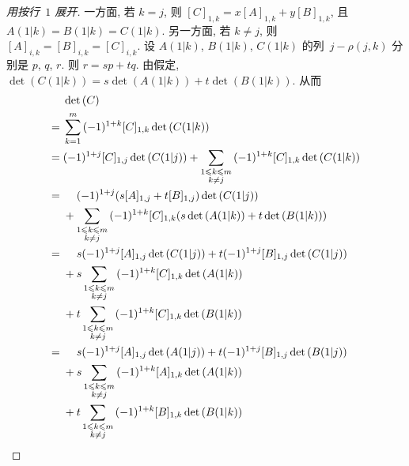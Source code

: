 \begin{proof}[用按行~\(1\) 展开]
    一方面, 若 \(k = j\), 则
    \([C]_{1,k} = x[A]_{1,k} + y[B]_{1,k}\),
    且
    \(A(1|k) = B(1|k) = C(1|k)\).
    另一方面, 若 \(k \neq j\),
    则
    \([A]_{i,k} = [B]_{i,k} = [C]_{i,k}\).
    设 \(A(1|k)\), \(B(1|k)\), \(C(1|k)\)
    的列~\(j - \rho(j, k)\)
    分别是
    \(p\), \(q\), \(r\).
    则
    \(r = sp + tq\).
    由假定,
    \(\det {(C(1|k))} = s \det {(A(1|k))} + t \det {(B(1|k))}\).
    从而
    \begin{align*}
             & \det {(C)}
        \\
        = {} &
        \sum_{k = 1}^{m}
        {(-1)^{1 + k} [C]_{1,k} \det {(C(1|k))}}
        \\
        = {} &
        (-1)^{1 + j} [C]_{1,j} \det {(C(1|j))}
        +
        \sum_{\substack{1 \leq k \leq m     \\k \neq j}}
        {(-1)^{1 + k} [C]_{1,k} \det {(C(1|k))}}
        \\
        = {} &
        \hphantom{{} + {}}
        (-1)^{1 + j} (s[A]_{1,j} + t[B]_{1,j}) \det {(C(1|j))}
        \\
             &
        +
        \sum_{\substack{1 \leq k \leq m     \\k \neq j}}
        {(-1)^{1 + k} [C]_{1,k}
            (s \det {(A(1|k))} + t \det {(B(1|k))})}
        \\
        = {} &
        \hphantom{{} + {}}
        s (-1)^{1 + j} [A]_{1,j} \det {(C(1|j))}
        + t (-1)^{1 + j} [B]_{1,j} \det {(C(1|j))}
        \\
             &
        + s \sum_{\substack{1 \leq k \leq m \\k \neq j}}
        {(-1)^{1 + k} [C]_{1,k} \det {(A(1|k))}}
        \\
             &
        + t \sum_{\substack{1 \leq k \leq m \\k \neq j}}
        {(-1)^{1 + k} [C]_{1,k} \det {(B(1|k))}}
        \\
        = {} &
        \hphantom{{} + {}}
        s (-1)^{1 + j} [A]_{1,j} \det {(A(1|j))}
        + t (-1)^{1 + j} [B]_{1,j} \det {(B(1|j))}
        \\
             &
        + s \sum_{\substack{1 \leq k \leq m \\k \neq j}}
        {(-1)^{1 + k} [A]_{1,k} \det {(A(1|k))}}
        \\
             &
        + t \sum_{\substack{1 \leq k \leq m \\k \neq j}}
        {(-1)^{1 + k} [B]_{1,k} \det {(B(1|k))}}
        \\

\end{align*}
\end{proof}
